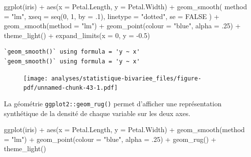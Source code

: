\documentclass[
  letterpaper,
  DIV=11,
  numbers=noendperiod,
  oneside]{scrreprt}
\newenvironment{Shaded}{\begin{snugshade}}{\end{snugshade}}
\newcommand{\AttributeTok}[1]{\textcolor[rgb]{0.40,0.45,0.13}{#1}}
\newcommand{\ConstantTok}[1]{\textcolor[rgb]{0.56,0.35,0.01}{#1}}
\newcommand{\DecValTok}[1]{\textcolor[rgb]{0.68,0.00,0.00}{#1}}
\newcommand{\FloatTok}[1]{\textcolor[rgb]{0.68,0.00,0.00}{#1}}
\newcommand{\FunctionTok}[1]{\textcolor[rgb]{0.28,0.35,0.67}{#1}}
\newcommand{\NormalTok}[1]{\textcolor[rgb]{0.00,0.23,0.31}{#1}}
\newcommand{\SpecialCharTok}[1]{\textcolor[rgb]{0.37,0.37,0.37}{#1}}
\newcommand{\StringTok}[1]{\textcolor[rgb]{0.13,0.47,0.30}{#1}}
\begin{document}
\begin{tcolorbox}
\begin{Shaded}
\begin{Highlighting}[]
\FunctionTok{ggplot}\NormalTok{(iris) }\SpecialCharTok{+}
  \FunctionTok{aes}\NormalTok{(}\AttributeTok{x =}\NormalTok{ Petal.Length, }\AttributeTok{y =}\NormalTok{ Petal.Width) }\SpecialCharTok{+}
  \FunctionTok{geom\_smooth}\NormalTok{(}
    \AttributeTok{method =} \StringTok{"lm"}\NormalTok{, }
    \AttributeTok{xseq =} \FunctionTok{seq}\NormalTok{(}\DecValTok{0}\NormalTok{, }\DecValTok{1}\NormalTok{, }\AttributeTok{by =}\NormalTok{ .}\DecValTok{1}\NormalTok{),}
    \AttributeTok{linetype =} \StringTok{"dotted"}\NormalTok{,}
    \AttributeTok{se =} \ConstantTok{FALSE}
\NormalTok{  ) }\SpecialCharTok{+}
  \FunctionTok{geom\_smooth}\NormalTok{(}\AttributeTok{method =} \StringTok{"lm"}\NormalTok{) }\SpecialCharTok{+}
  \FunctionTok{geom\_point}\NormalTok{(}\AttributeTok{colour =} \StringTok{"blue"}\NormalTok{, }\AttributeTok{alpha =}\NormalTok{ .}\DecValTok{25}\NormalTok{) }\SpecialCharTok{+}
  \FunctionTok{theme\_light}\NormalTok{() }\SpecialCharTok{+}
  \FunctionTok{expand\_limits}\NormalTok{(}\AttributeTok{x =} \DecValTok{0}\NormalTok{, }\AttributeTok{y =} \SpecialCharTok{{-}}\FloatTok{0.5}\NormalTok{)}
\end{Highlighting}
\end{Shaded}

\begin{verbatim}
`geom_smooth()` using formula = 'y ~ x'
`geom_smooth()` using formula = 'y ~ x'
\end{verbatim}

\begin{figure}[H]

{\centering \texttt{[image: analyses/statistique-bivariee\_files/figure-pdf/unnamed-chunk-43-1.pdf]}

}

\end{figure}

\end{tcolorbox}

La géométrie \texttt{ggplot2::geom\_rug()} permet d'afficher une
représentation synthétique de la densité de chaque variable sur les deux
axes.

\begin{Shaded}
\begin{Highlighting}[]
\FunctionTok{ggplot}\NormalTok{(iris) }\SpecialCharTok{+}
  \FunctionTok{aes}\NormalTok{(}\AttributeTok{x =}\NormalTok{ Petal.Length, }\AttributeTok{y =}\NormalTok{ Petal.Width) }\SpecialCharTok{+}
  \FunctionTok{geom\_smooth}\NormalTok{(}\AttributeTok{method =} \StringTok{"lm"}\NormalTok{) }\SpecialCharTok{+}
  \FunctionTok{geom\_point}\NormalTok{(}\AttributeTok{colour =} \StringTok{"blue"}\NormalTok{, }\AttributeTok{alpha =}\NormalTok{ .}\DecValTok{25}\NormalTok{) }\SpecialCharTok{+}
  \FunctionTok{geom\_rug}\NormalTok{() }\SpecialCharTok{+}
  \FunctionTok{theme\_light}\NormalTok{()}
\end{Highlighting}
\end{Shaded}
\end{document}
